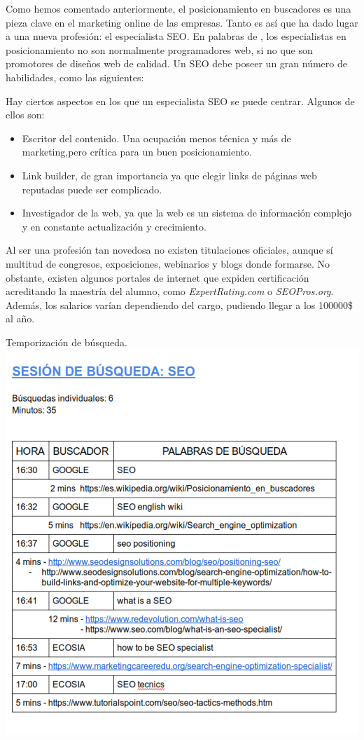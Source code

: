 	Como hemos comentado anteriormente, el posicionamiento en buscadores es una pieza clave en el marketing online de las empresas. Tanto es así que ha dado lugar a una nueva profesión: el especialista SEO. En palabras de \cite{seo-prof}, los especialistas en posicionamiento no son normalmente programadores web, si no que son promotores de diseños web de calidad. Un SEO debe poseer un gran número de habilidades, como las siguientes:

	
	Hay ciertos aspectos en los que un especialista SEO se puede centrar. Algunos de ellos son:
	
	\begin{itemize}
		\item Escritor del contenido. Una ocupación menos técnica y más de marketing,pero crítica para un buen posicionamiento.
		\item Link builder, de gran importancia ya que elegir links de páginas web reputadas puede ser complicado.
		\item Investigador de la web, ya que la web es un sistema de información complejo y en constante actualización y crecimiento.
	\end{itemize}
	
	Al ser una profesión tan novedosa no existen titulaciones oficiales, aunque sí multitud de congresos, exposiciones, webinarios y blogs donde formarse. No obstante, existen algunos portales de internet que expiden certificación acreditando la maestría del alumno, como \textit{ExpertRating.com} o \textit{SEOPros.org}. Además, los salarios varían dependiendo del cargo, pudiendo llegar a los 100000\$ al año.
	
	\begin{subsection}{Temporizaci\'on de b\'usqueda.}
		\includegraphics[width=1.2\textwidth]{seo-session.png}
	\end{subsection}
	\newpage
	
